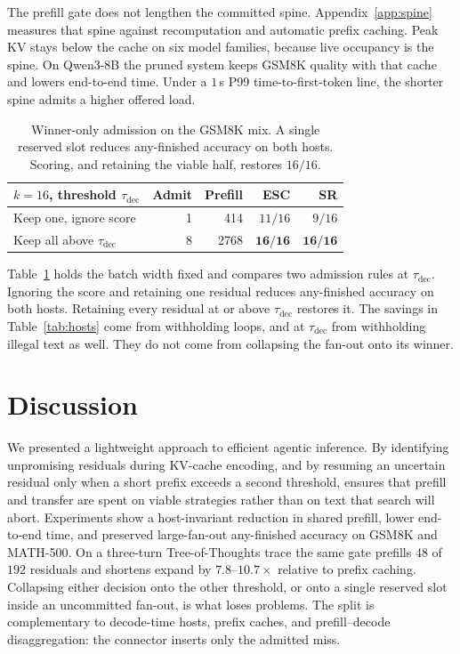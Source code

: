 The prefill gate does not lengthen the committed spine.
Appendix~\ref{app:spine} measures that spine against recomputation and automatic prefix caching.
Peak KV stays below the cache on six model families, because live occupancy is the spine.
On Qwen3-8B the pruned system keeps GSM8K quality with that cache and lowers end-to-end time.
Under a $1$\,s P99 time-to-first-token line, the shorter spine admits a higher offered load.

\begin{table}[H]
\centering
\small
\setlength{\tabcolsep}{4pt}
\begin{tabular}{@{}lrrrr@{}}
\toprule
$k{=}16$, threshold $\tau_{\mathrm{dec}}$ & Admit & Prefill & ESC & SR \\
\midrule
Keep one, ignore score & 1 & 414 & $11/16$ & $9/16$ \\
Keep all above $\tau_{\mathrm{dec}}$ & 8 & 2768 & $\mathbf{16/16}$ & $\mathbf{16/16}$ \\
\bottomrule
\end{tabular}
\caption{Winner-only admission on the GSM8K mix.
A single reserved slot reduces any-finished accuracy on both hosts.
Scoring, and retaining the viable half, restores $16/16$.}
\label{tab:best}
\end{table}

Table~\ref{tab:best} holds the batch width fixed and compares two admission rules at $\tau_{\mathrm{dec}}$.
Ignoring the score and retaining one residual reduces any-finished accuracy on both hosts.
Retaining every residual at or above $\tau_{\mathrm{dec}}$ restores it.
The savings in Table~\ref{tab:hosts} come from withholding loops, and at $\tau_{\mathrm{dec}}$ from withholding illegal text as well.
They do not come from collapsing the fan-out onto its winner.

\FloatBarrier
\section{Discussion}
\label{sec:discussion}

We presented a lightweight approach to efficient agentic inference.
By identifying unpromising residuals during KV-cache encoding, and by resuming an uncertain residual only when a short prefix exceeds a second threshold, \sys ensures that prefill and transfer are spent on viable strategies rather than on text that search will abort.
Experiments show a host-invariant reduction in shared prefill, lower end-to-end time, and preserved large-fan-out any-finished accuracy on GSM8K and MATH-500.
On a three-turn Tree-of-Thoughts trace the same gate prefills $48$ of $192$ residuals and shortens expand by $7.8$--$10.7\times$ relative to prefix caching.
Collapsing either decision onto the other threshold, or onto a single reserved slot inside an uncommitted fan-out, is what loses problems.
The split is complementary to decode-time hosts, prefix caches, and prefill--decode disaggregation: the connector inserts only the admitted miss.

